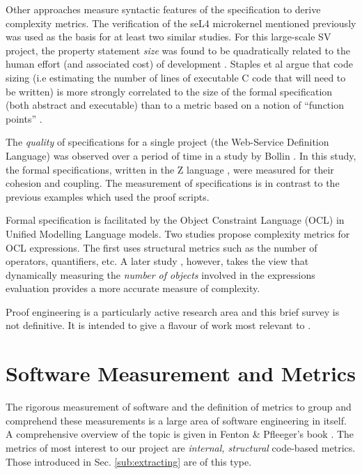 Other approaches measure syntactic features of the specification to derive complexity metrics. The verification of the seL4 microkernel mentioned previously was used as the basis for at least two similar studies. For this large-scale SV project, the property statement \textit{size} was found to be quadratically related to the human effort (and associated cost) of development \cite{CostIndicator}. Staples et al argue that code sizing (i.e estimating the number of lines of executable C code that will need to be written) is more strongly correlated to the size of the formal specification (both abstract and executable) than to a metric based on a notion of ``function points'' \cite{Staples:2013}.
   
The \textit{quality} of specifications for a single project (the Web-Service Definition Language) was observed over a period of time in a study by Bollin \cite{Zspecs}. In this study, the formal specifications, written in the Z language \cite{Zlang}, were measured for their cohesion and coupling. The measurement of specifications is in contrast to the previous examples \cite{Aspinall2016, CostIndicator} which used the proof scripts.

Formal specification is facilitated by the Object Constraint Language (OCL) in Unified Modelling Language models. Two studies propose complexity metrics for OCL expressions. The first \cite{TowardsOCL} uses structural metrics such as the number of operators, quantifiers, etc. A later study \cite{OCLalt}, however, takes the view that dynamically measuring the \textit{number of objects} involved in the expressions evaluation provides a more accurate measure of complexity.

Proof engineering is a particularly active research area and this brief survey is not definitive. It is intended to give a flavour of work most relevant to \where.     
 
       
\section{Software Measurement and Metrics}
\label{sec:lrmm}
The rigorous measurement of software and the definition of metrics to group and comprehend these measurements is a large area of software engineering in itself. A comprehensive overview of the topic is given in Fenton \& Pfleeger's book \cite{FentonPfleeger}. The metrics of most interest to our project are \textit{internal, structural} code-based metrics. Those introduced in Sec. \ref{sub:extracting} are of this type.

